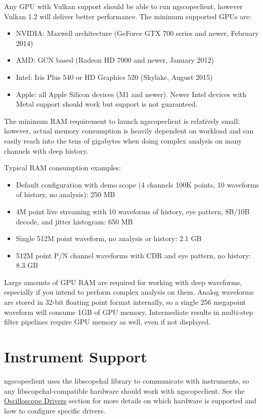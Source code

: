 Any GPU with Vulkan support should be able to run ngscopeclient, however Vulkan 1.2 will deliver better performance.
The minimum supported GPUs are:
\begin{itemize}
\item NVIDIA: Maxwell architecture (GeForce GTX 700 series and newer, February 2014)
\item AMD: GCN based (Radeon HD 7000 and newer, January 2012)
\item Intel: Iris Plus 540 or HD Graphics 520 (Skylake, August 2015)
\item Apple: all Apple Silicon devices (M1 and newer). Newer Intel devices with Metal support should work but support
is not guaranteed.
\end{itemize}

The minimum RAM requirement to launch ngscopeclient is relatively small; however, actual memory consumption is
heavily dependent on workload and can easily reach into the tens of gigabytes when doing complex analysis on many
channels with deep history.

Typical RAM consumption examples:
\begin{itemize}
\item Default configuration with demo scope (4 channels 100K points, 10 waveforms of history, no analysis): 250 MB
\item 4M point live streaming with 10 waveforms of history, eye pattern, 8B/10B decode, and jitter histogram: 650 MB
\item Single 512M point waveform, no analysis or history: 2.1 GB
\item 512M point P/N channel waveforms with CDR and eye pattern, no history: 8.3 GB
\end{itemize}

Large amounts of GPU RAM are required for working with deep waveforms, especially if you intend to perform
complex analysis on them. Analog waveforms are stored in 32-bit floating point format internally, so a single 256
megapoint waveform will consume 1GB of GPU memory. Intermediate results in multi-step filter pipelines require GPU
memory as well, even if not displayed.

\section{Instrument Support}

ngscopeclient uses the libscopehal library to communicate with instruments, so any libscopehal-compatible hardware
should work with ngscopeclient. See the \hyperref[sec:scope-drivers]{Oscilloscope Drivers} section for more details on
which hardware is supported and how to configure specific drivers.

